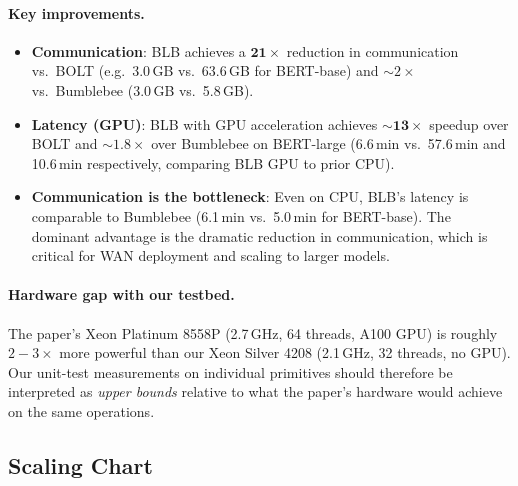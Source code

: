 \paragraph{Key improvements.}
\begin{itemize}[nosep]
  \item \textbf{Communication}: BLB achieves a $\mathbf{21\times}$ reduction in communication vs.\ BOLT (e.g.\ 3.0\,GB vs.\ 63.6\,GB for BERT-base) and $\sim\!2\times$ vs.\ Bumblebee (3.0\,GB vs.\ 5.8\,GB).
  \item \textbf{Latency (GPU)}: BLB with GPU acceleration achieves $\sim\!\mathbf{13\times}$ speedup over BOLT and $\sim\!1.8\times$ over Bumblebee on BERT-large (6.6\,min vs.\ 57.6\,min and 10.6\,min respectively, comparing BLB GPU to prior CPU).
  \item \textbf{Communication is the bottleneck}: Even on CPU, BLB's latency is comparable to Bumblebee (6.1\,min vs.\ 5.0\,min for BERT-base). The dominant advantage is the dramatic reduction in communication, which is critical for WAN deployment and scaling to larger models.
\end{itemize}

\paragraph{Hardware gap with our testbed.}
The paper's Xeon Platinum 8558P (2.7\,GHz, 64 threads, A100 GPU) is roughly $2{-}3\times$ more powerful than our Xeon Silver 4208 (2.1\,GHz, 32 threads, no GPU).
Our unit-test measurements on individual primitives should therefore be interpreted as \emph{upper bounds} relative to what the paper's hardware would achieve on the same operations.

\subsection{Scaling Chart}\label{ssec:scaling-chart}

